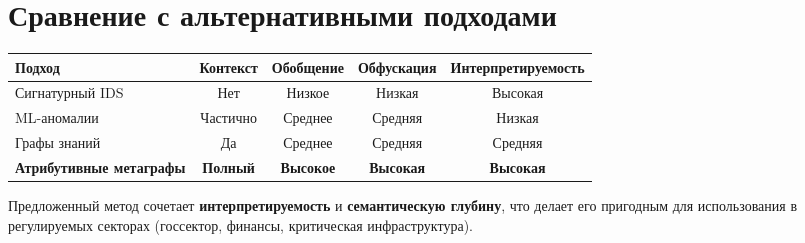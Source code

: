 \section{Сравнение с альтернативными подходами}

\begin{center}
\begin{tabular}{|l|c|c|c|c|}
\hline
Подход & Контекст & Обобщение & Обфускация & Интерпретируемость \\
\hline
Сигнатурный IDS & Нет & Низкое & Низкая & Высокая \\
ML-аномалии & Частично & Среднее & Средняя & Низкая \\
Графы знаний & Да & Среднее & Средняя & Средняя \\
\textbf{Атрибутивные метаграфы} & \textbf{Полный} & \textbf{Высокое} & \textbf{Высокая} & \textbf{Высокая} \\
\hline
\end{tabular}
\end{center}

Предложенный метод сочетает \textbf{интерпретируемость} и \textbf{семантическую глубину}, что делает его пригодным для использования в регулируемых секторах (госсектор, финансы, критическая инфраструктура).